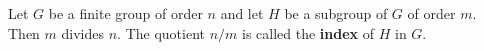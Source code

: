 Let $G$ be a finite group of order $n$ and let $H$ be a subgroup of $G$ of order $m$. Then $m$ divides $n$. The quotient $n/m$ is called the \textbf{index} of $H$ in $G$.
